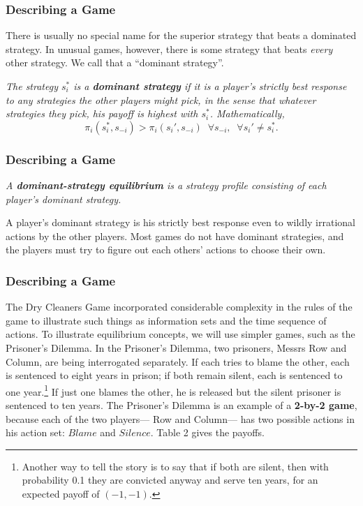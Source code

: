  \begin{frame}[fragile]\frametitle{Describing a Game}
  There is usually no special  name for the superior strategy that beats a
dominated strategy. In unusual games, however,  there is some strategy that
beats {\it every} other strategy. We call that a ``dominant strategy''.

 
{\it The strategy $s_i^*$ is a {\bf dominant strategy} if it is a player's
strictly best response to {\rm any} strategies the other players might pick, in
the sense that whatever strategies they pick, his payoff is highest with
$s_i^*$.  Mathematically,}
\begin{equation} \label{e4a}
 \pi_i(s_i^*,s_{-i}) > \pi_i(s_i',s_{-i}) \;\; \forall s_{-i},\;\; \forall s_i'
\neq s_i^*.
\end{equation}

\end{frame}
 \begin{frame}[fragile]\frametitle{Describing a Game}
  {\it A {\bf dominant-strategy equilibrium} is a strategy profile
consisting of each player's dominant strategy.}

  A player's dominant strategy is his strictly best response even to wildly
irrational actions by the other players.  Most games do not have dominant
strategies, and the players must try to figure out each others' actions to
choose their own.
\end{frame}

 \begin{frame}[fragile]\frametitle{Describing a Game}
           The   {Dry Cleaners Game}  incorporated considerable complexity in
the rules of the game to illustrate such things as information sets and the time
sequence of actions. To illustrate equilibrium concepts, we will use simpler
games, such as  the Prisoner's Dilemma.  In  the Prisoner's Dilemma, two
prisoners, Messrs Row and Column, are being interrogated separately.  If each
tries to blame the other, each is sentenced to eight years in prison; if both
remain silent, each is sentenced to one year.\footnote{Another way to tell the
story is to say that  if both are silent,  then with probability 0.1 they are
convicted anyway and serve ten years, for an expected payoff of $(- 1,-1)$.} If
just one blames the other, he is released but the silent prisoner is sentenced
to ten years.   The  Prisoner's Dilemma is an example of a {\bf 2-by-2 game},
because each of the two players--- Row and Column--- has two possible actions in
his action set: $Blame $ and $Silence $. Table  2 gives the payoffs.
\end{frame}


